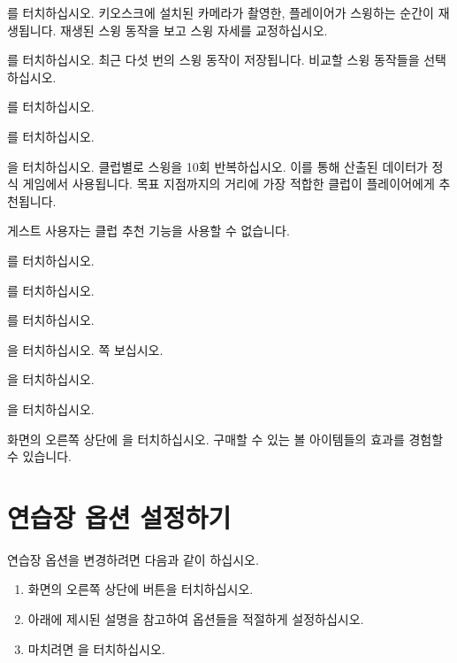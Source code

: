 \documentclass[10pt, openright, language=korean]{hzguide}
\begin{document}
를 터치하십시오. 
키오스크에 설치된 카메라가 촬영한, 플레이어가 스윙하는 순간이 재생됩니다.
재생된 스윙 동작을 보고 스윙 자세를 교정하십시오.

를 터치하십시오. 최근 다섯 번의 스윙 동작이 저장됩니다. 
비교할 스윙 동작들을 선택하십시오.

를 터치하십시오. 

를 터치하십시오.

을 터치하십시오. 클럽별로 스윙을 10회 반복하십시오. 
이를 통해 산출된 데이터가 정식 게임에서 사용됩니다.
목표 지점까지의 거리에 가장 적합한 클럽이 플레이어에게 추천됩니다.

\begin{Note}
게스트 사용자는 클럽 추천 기능을 사용할 수 없습니다.
\end{Note}

를 터치하십시오.

를 터치하십시오.

를 터치하십시오.

을 터치하십시오. 
\pageref{sec:troubleshooting} 쪽 \을 보십시오.

을 터치하십시오.

을 터치하십시오.

화면의 오른쪽 상단에 을 터치하십시오.
구매할 수 있는 볼 아이템들의 효과를 경험할 수 있습니다.

\section{연습장 옵션 설정하기}

연습장 옵션을 변경하려면 다음과 같이 하십시오.

\begin{enumerate}
\item 화면의 오른쪽 상단에  버튼을 터치하십시오.
\item 아래에 제시된 설명을 참고하여 옵션들을 적절하게 설정하십시오.
\item 마치려면 을 터치하십시오.
\end{enumerate}
\end{document}
